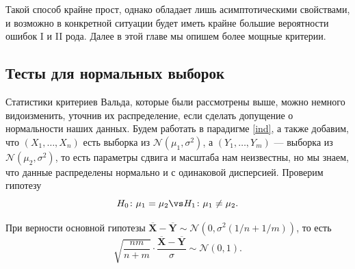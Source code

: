 Такой способ крайне прост, однако обладает лишь асимптотическими свойствами, и возможно в конкретной ситуации будет иметь крайне большие вероятности ошибок I и II рода. Далее в этой главе мы опишем более мощные критерии.

\subsection{Тесты для нормальных выборок}\label{ttest}

Статистики критериев Вальда, которые были рассмотрены выше, можно немного видоизменить, уточнив их распределение, если сделать допущение о нормальности наших данных. Будем работать в парадигме \ref{ind}, а также добавим, что $(X_1, \ldots, X_n)$ есть выборка из $\mathcal{N}(\mu_1, \sigma^2)$, а $(Y_1, \ldots, Y_m)$ --- выборка из $\mathcal{N}(\mu_2, \sigma^2)$, то есть параметры сдвига и масштаба нам неизвестны, но мы знаем, что данные распределены нормально и с одинаковой дисперсией. Проверим гипотезу
\[
H_0\colon \mu_1 = \mu_2 \vs H_1\colon\mu_1 \ne \mu_2.
\]

При верности основной гипотезы $\overline{\mathbf X} - \overline{\mathbf Y} \sim \mathcal{N}(0, \sigma^2(1/n + 1/m))$, то есть
\begin{equation}\label{ttest_mean}
    \sqrt{\frac{nm}{n+m}}\cdot \frac{\overline{\mathbf X} - \overline{\mathbf Y}}{\sigma} \sim \mathcal{N}(0, 1).
\end{equation}

